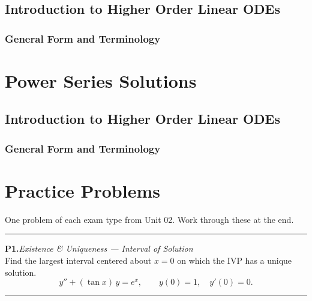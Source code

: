 \documentclass[10pt]{article}
\newcommand{\m}[1]{$#1$}
\newcommand{\annotspace}[1][3.5cm]{\vspace{#1}}
\begin{document}
\subsection{Introduction to Higher Order Linear ODEs}

    \subsubsection{General Form and Terminology}

\section{Power Series Solutions}

\subsection{Introduction to Higher Order Linear ODEs}

    \subsubsection{General Form and Terminology}
    
\newpage
\section*{Practice Problems}

One problem of each exam type from Unit 02. Work through these at the end.

\bigskip
\hrule
\bigskip

\noindent\textbf{P1.}\quad\textit{Existence \& Uniqueness --- Interval of Solution}\\
Find the largest interval centered about \m{x = 0} on which the IVP has a unique solution.
\[
    y'' + (\tan x)\,y = e^x, \qquad y(0) = 1,\quad y'(0) = 0.
\]
\annotspace[5cm]

\hrule\medskip
\end{document}
